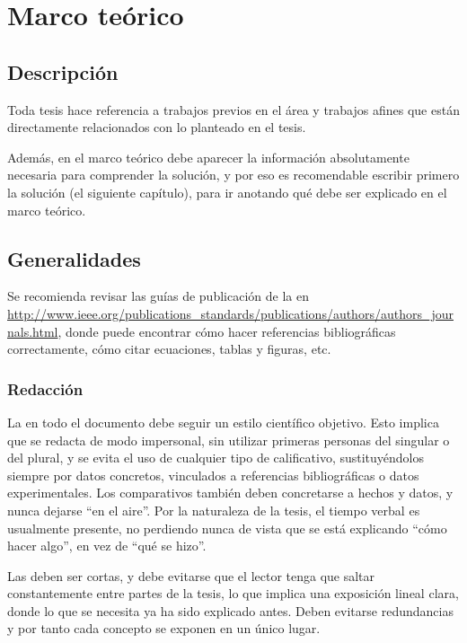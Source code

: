 \chapter{Marco teórico}
\label{ch:marco}

\section{Descripción}

Toda tesis hace referencia a trabajos previos en el área y trabajos afines que
están directamente relacionados con lo planteado en el tesis.

Además, en el marco teórico debe aparecer la información absolutamente
necesaria para comprender la solución, y por eso es recomendable escribir
primero la solución (el siguiente capítulo), para ir anotando qué debe ser
explicado en el marco teórico.

\section{Generalidades}

Se recomienda revisar las guías de publicación de la  en
\url{http://www.ieee.org/publications_standards/publications/authors/authors_journals.html},
donde puede encontrar cómo hacer referencias bibliográficas correctamente, cómo
citar ecuaciones, tablas y figuras, etc.  

\subsection{Redacción}

La  en todo el documento debe seguir un estilo científico
objetivo. Esto implica que se redacta de modo impersonal, sin utilizar primeras
personas del singular o del plural, y se evita el uso de cualquier tipo de
calificativo, sustituyéndolos siempre por datos concretos, vinculados a
referencias bibliográficas o datos experimentales. Los comparativos también
deben concretarse a hechos y datos, y nunca dejarse ``en el aire''. Por la
naturaleza de la tesis, el tiempo verbal es usualmente presente, no perdiendo
nunca de vista que se está explicando ``cómo hacer algo'', en vez de ``qué se
hizo''.

Las  deben ser cortas, y debe evitarse que el lector tenga que saltar
constantemente entre partes de la tesis, lo que implica una exposición lineal
clara, donde lo que se necesita ya ha sido explicado antes. Deben evitarse
redundancias y por tanto cada concepto se exponen en un único lugar.

